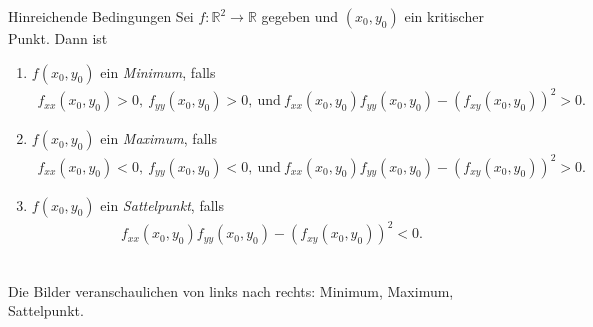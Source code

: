 \begin{mybox}{Hinreichende Bedingungen}
Sei $f : \mathbb{R}^2 \to \mathbb{R}$ gegeben und $(x_0,y_0) $ ein kritischer Punkt.
Dann ist
\renewcommand{\labelenumi}{\theenumi.}
\begin{enumerate}
\item
{}
$f(x_0,y_0)$ ein \textit{Minimum}, falls
\begin{align*}
f_{xx}(x_0,y_0) > 0, \ f_{yy}(x_0,y_0) > 0, \ \text{und} \ f_{xx}(x_0,y_0)f_{yy}(x_0,y_0) - (f_{xy}(x_0,y_0))^2  > 0.
\end{align*}

\item
{}
$f(x_0,y_0)$ ein \textit{Maximum}, falls
\begin{align*}
f_{xx}(x_0,y_0) < 0, \ f_{yy}(x_0,y_0) < 0, \ \text{und} \ f_{xx}(x_0,y_0)f_{yy}(x_0,y_0) - (f_{xy}(x_0,y_0))^2  > 0.
\end{align*}

\item
{}
$f(x_0,y_0)$ ein \textit{Sattelpunkt}, falls
\begin{align*}
f_{xx}(x_0,y_0)f_{yy}(x_0,y_0) - (f_{xy}(x_0,y_0))^2  < 0.
\end{align*}

\end{enumerate}
\end{mybox}
\newpage




\pgfplotsset{width=7cm,compat=1.5.1}
\\
Die Bilder veranschaulichen von links nach rechts:
Minimum, Maximum, Sattelpunkt.


